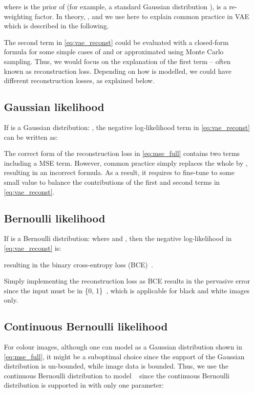 \documentclass[10pt,twocolumn,letterpaper]{article}
\begin{document}
    where  is the prior of  (for example, a standard Gaussian distribution ),   is a re-weighting factor. In theory, , and we use  here to explain common practice in VAE which is described in the following.

    The second term in \eqref{eq:vae_reconst} could be evaluated with a closed-form formula for some simple cases of  and  or approximated using Monte Carlo sampling. Thus, we would focus on the explanation of the first term -- often known as reconstruction loss. Depending on how  is modelled, we could have different reconstruction losses, as explained below.

    \subsection{Gaussian likelihood}
        If  is a Gaussian distribution: , the negative log-likelihood term in \eqref{eq:vae_reconst} can be written as:
        
        The correct form of the reconstruction loss in \eqref{eq:mse_full} contains two terms including a  MSE term. However, common practice simply replaces the whole  by , resulting in an incorrect formula. As a result, it requires to fine-tune  to some small value to balance the contributions of the first and second terms in \eqref{eq:vae_reconst}.

    \subsection{Bernoulli likelihood}
        If  is a Bernoulli distribution:  where  and , then the negative log-likelihood in \eqref{eq:vae_reconst} is: 
        
        resulting in the binary cross-entropy loss (BCE)~\cite{creswell2017denoising}.
        
        Simply implementing the reconstruction loss as BCE results in the pervasive error since the input  must be in \{0, 1\}~\cite{loaiza2019continuous}, which is applicable for black and white images only.



    \subsection{Continuous Bernoulli likelihood}
        For colour images, although one can model  as a Gaussian distribution shown in \eqref{eq:mse_full}, it might be a suboptimal choice since the support of the Gaussian distribution is un-bounded, while image data is bounded. Thus, we use the continuous Bernoulli distribution to model ~\cite{loaiza2019continuous} since the continuous Bernoulli distribution is supported in  with only one parameter:
\end{document}
